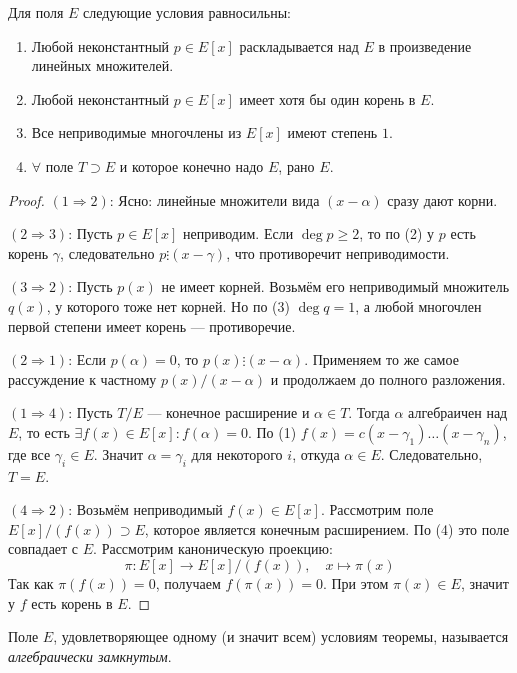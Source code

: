 \begin{theorem}
    Для поля $E$ следующие условия равносильны:
    \begin{enumerate}
        \item Любой неконстантный $p \in E[x]$ раскладывается над $E$ в произведение линейных множителей.
        \item Любой неконстантный $p \in E[x]$ имеет хотя бы один корень в $E$.
        \item Все неприводимые многочлены из $E[x]$ имеют степень $1$.
        \item $\forall$ поле $T \supset E$ и которое конечно надо $E$, рано $E$.
    \end{enumerate}

\begin{proof}
        $(1 \Rightarrow 2)$: Ясно: линейные множители вида $(x - \alpha)$ сразу дают корни.

        $(2 \Rightarrow 3)$: Пусть $p \in E[x]$ неприводим.
        Если $\deg p \geq 2$, то по (2) у $p$ есть корень $\gamma$,
        следовательно $p \vdots (x - \gamma)$, что противоречит неприводимости.

        $(3 \Rightarrow 2)$: Пусть $p(x)$ не имеет корней.
        Возьмём его неприводимый множитель $q(x)$, у которого тоже нет корней.
        Но по (3) $\deg q = 1$, а любой многочлен первой степени имеет корень --- противоречие.

        $(2 \Rightarrow 1)$: Если $p(\alpha) = 0$, то $p(x) \vdots (x - \alpha)$.
        Применяем то же самое рассуждение к частному $p(x)/(x - \alpha)$ и продолжаем до полного разложения.

        $(1 \Rightarrow 4)$: Пусть $T / E$ --- конечное расширение и $\alpha \in T$.
        Тогда $\alpha$ алгебраичен над $E$, то есть $\exists f(x) \in E[x]: f(\alpha) = 0$.
        По (1) $f(x) = c(x - \gamma_1)\dots(x - \gamma_n)$, где все $\gamma_i \in E$.
        Значит $\alpha = \gamma_i$ для некоторого $i$, откуда $\alpha \in E$. Следовательно, $T = E$.

        $(4 \Rightarrow 2)$: Возьмём неприводимый $f(x) \in E[x]$.
        Рассмотрим поле $E[x]/(f(x)) \supset E$, которое является конечным расширением.
        По (4) это поле совпадает с $E$. Рассмотрим каноническую проекцию:
        \[
            \pi: E[x] \to E[x]/(f(x)), \quad x \mapsto \pi(x)
        \]
        Так как $\pi(f(x)) = 0$, получаем $f(\pi(x)) = 0$.
        При этом $\pi(x) \in E$, значит у $f$ есть корень в $E$.
    \end{proof}
\end{theorem}

\begin{definition}
    Поле $E$, удовлетворяющее одному (и значит всем) условиям теоремы, называется
    \emph{алгебраически замкнутым}.
\end{definition}
